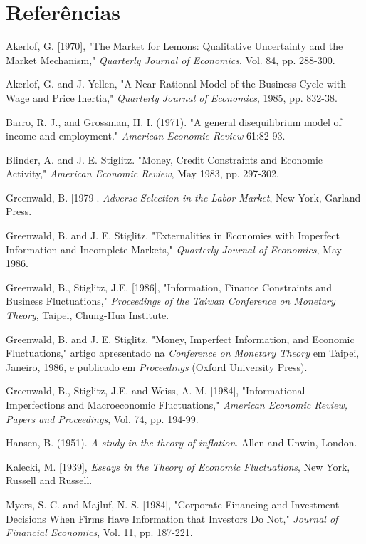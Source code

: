 \documentclass[12pt]{article}
\begin{document}
\newpage

\section*{Referências}

Akerlof, G. [1970], "The Market for Lemons: Qualitative Uncertainty and the Market Mechanism," \textit{Quarterly Journal of Economics}, Vol. 84, pp. 288-300.

Akerlof, G. and J. Yellen, "A Near Rational Model of the Business Cycle with Wage and Price Inertia," \textit{Quarterly Journal of Economics}, 1985, pp. 832-38.

Barro, R. J., and Grossman, H. I. (1971). "A general disequilibrium model of income and employment." \textit{American Economic Review} 61:82-93.

Blinder, A. and J. E. Stiglitz. "Money, Credit Constraints and Economic Activity," \textit{American Economic Review}, May 1983, pp. 297-302.

Greenwald, B. [1979]. \textit{Adverse Selection in the Labor Market}, New York, Garland Press.

Greenwald, B. and J. E. Stiglitz. "Externalities in Economies with Imperfect Information and Incomplete Markets," \textit{Quarterly Journal of Economics}, May 1986.

Greenwald, B., Stiglitz, J.E. [1986], "Information, Finance Constraints and Business Fluctuations," \textit{Proceedings of the Taiwan Conference on Monetary Theory}, Taipei, Chung-Hua Institute.

Greenwald, B. and J. E. Stiglitz. "Money, Imperfect Information, and Economic Fluctuations," artigo apresentado na \textit{Conference on Monetary Theory} em Taipei, Janeiro, 1986, e publicado em \textit{Proceedings} (Oxford University Press).

Greenwald, B., Stiglitz, J.E. and Weiss, A. M. [1984], "Informational Imperfections and Macroeconomic Fluctuations," \textit{American Economic Review, Papers and Proceedings}, Vol. 74, pp. 194-99.

Hansen, B. (1951). \textit{A study in the theory of inflation}. Allen and Unwin, London.

Kalecki, M. [1939], \textit{Essays in the Theory of Economic Fluctuations}, New York, Russell and Russell.

Myers, S. C. and Majluf, N. S. [1984], "Corporate Financing and Investment Decisions When Firms Have Information that Investors Do Not," \textit{Journal of Financial Economics}, Vol. 11, pp. 187-221.
\end{document}
